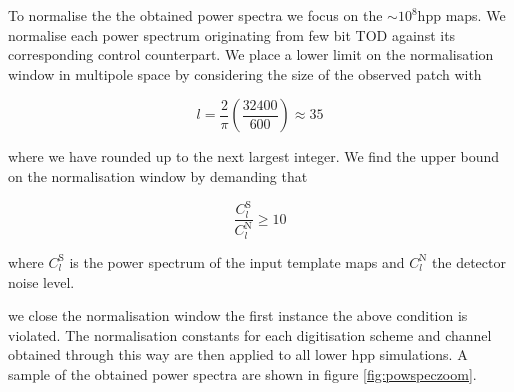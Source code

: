 \documentclass[apj]{emulateapj}
\begin{document}
To normalise the the obtained power spectra we focus on the $\sim 10^8 \mathrm{hpp}$ maps. We normalise each power spectrum originating from few bit TOD against its corresponding control counterpart. We place a lower limit on the normalisation window in multipole space by considering the size of the observed patch with

\[ l = \frac{2}{\pi} \left( \frac{32400}{600} \right) \approx 35 \]

where we have rounded up to the next largest integer. We find the upper bound on the normalisation window by demanding that

\[ \frac{C_l^{\mathrm{S}}}{C_l^{\mathrm{N}}} \geq 10 \]

where $C_l^{\mathrm{S}}$ is the power spectrum of the input template maps and $C_l^{\mathrm{N}}$ the detector noise level.

we close the normalisation window the first instance the above condition is violated. The normalisation constants for each digitisation scheme and channel obtained through this way are then applied to all lower hpp simulations. A sample of the obtained power spectra are shown in figure \ref{fig:powspeczoom}.
\end{document}

